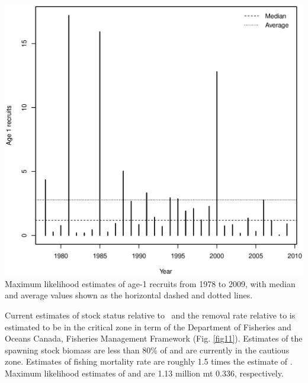 \begin{multicols}{2}
\begin{figurehere}
	\centering
	\includegraphics[width=0.95\columnwidth]{iscamFigs/phakefig14.eps}\\
	\caption{Maximum likelihood estimates of age-1 recruits from 1978 to 2009, with median and average values shown as the horizontal dashed and dotted lines.}\label{fig10}
\end{figurehere}

Current estimates of stock status relative to \bmsy\ and the removal rate relative to \fmsy is estimated to be in the critical zone in term of the Department of Fisheries and Oceans Canada, Fisheries Management Framework (Fig. \ref{fig11}).  Estimates of the spawning stock biomass are less than 80\% of \bmsy and are currently in the cautious zone.  Estimates of fishing mortality rate are roughly 1.5 times the estimate of \fmsy.  Maximum likelihood estimates of \bmsy and \fmsy are 1.13 million mt 0.336, respectively. 


\end{multicols}
